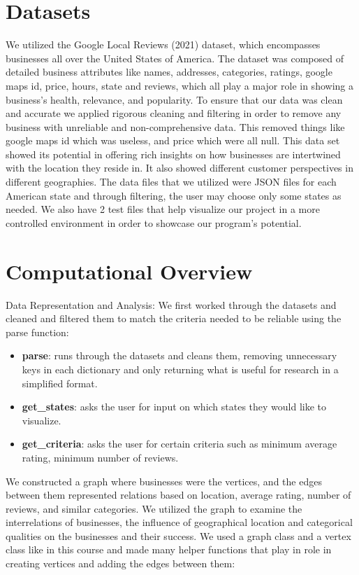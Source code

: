 \documentclass[fontsize=11pt]{article}
\begin{document}
\section*{Datasets}

We utilized the Google Local Reviews (2021) dataset, which encompasses businesses all over the United States of America. The dataset was composed of detailed business attributes like names, addresses, categories, ratings, google maps id, price, hours, state and reviews, which all play a major role in showing a business's health, relevance, and popularity. To ensure that our data was clean and accurate we applied rigorous cleaning and filtering in order to remove any business with unreliable and non-comprehensive data. This removed things like google maps id which was useless, and price which were all null. This data set showed its potential in offering rich insights on how businesses are intertwined with the location they reside in. It also showed different customer perspectives in different geographies. The data files that we utilized were JSON files for each American state and through filtering, the user may choose only some states as needed. We also have 2 test files that help visualize our project in a more controlled environment in order to showcase our program's potential.

\section*{Computational Overview}

Data Representation and Analysis: We first worked through the datasets and cleaned and filtered them to match the criteria needed to be reliable using the parse function:

\begin{itemize}
    \item \textbf{parse}: runs through the datasets and cleans them, removing unnecessary keys in each dictionary and only returning what is useful for research in a simplified format.
    \item \textbf{get\_states}: asks the user for input on which states they would like to visualize.
    \item \textbf{get\_criteria}: asks the user for certain criteria such as minimum average rating, minimum number of reviews.
\end{itemize}

We constructed a graph where businesses were the vertices, and the edges between them represented relations based on location, average rating, number of reviews, and similar categories. We utilized the graph to examine the interrelations of businesses, the influence of geographical location and categorical qualities on the businesses and their success. We used a graph class and a vertex class like in this course and made many helper functions that play in role in creating vertices and adding the edges between them:
\end{document}
